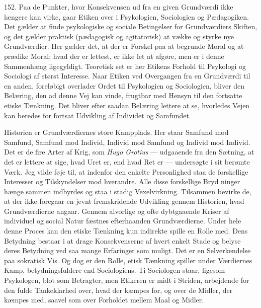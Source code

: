 \documentclass[12pt,a4paper]{book}
\newcommand{\opage}[1]{\marginnote{\footnotesize\textit{[#1]}}}
\begin{document}
152. Paa de Punkter, hvor Konsekvensen ud fra en given Grundværdi ikke længere kan virke,
gaar Etiken over i Psykologien, Sociologien og Pædagogiken. Det gælder at finde
psykologiske og sociale Betingelser for Grundværdiers Skiften, og det gælder praktisk
(pædagogisk og agitatorisk) at vække og styrke nye Grundværdier. Her gælder det, at der er
Forskel paa at begrunde Moral og at prædike Moral; hvad der er lettest, er ikke let at
afgøre, men er i denne Sammenhæng ligegyldigt. Teoretisk set er her Etikens Forhold til
Psykologi og Sociologi af størst Interesse. Naar Etiken ved Overgangen fra en Grundværdi
til en anden, foreløbigt overlader Ordet til Psykologien og Sociologien, bliver den Belæring, den ad denne Vej kan vinde, frugtbar med Hensyn til den fortsatte etiske Tænkning. Det
bliver efter saadan Belæring lettere at se, hvorledes Vejen kan beredes for fortsat
Udvikling af Individet og Samfundet.

Historien er Grundværdiernes store Kampplads. Her staar Samfund mod Samfund, Samfund mod
Individ, Individ mod Samfund og Individ mod Individ. Det er de fire Arter af Krig, som
\emph{Hugo Grotius} --- udgaaende fra den Sætning, at det er lettere at sige, hvad Uret er,
end hvad Ret er --- undersøgte i sit berømte Værk. Jeg vilde føje til, at indenfor den
enkelte Personlighed staa de forskellige Interesser og Tilskyndelser mod hverandre. Alle
disse forskellige Bryd%
\opage{364}ninger hænge sammen indbyrdes og staa i stadig Vexelvirkning.
Tilsammen bevirke de, at der ikke foregaar en jevnt fremskridende Udvikling gennem
Historien, hvad Grundværdierne angaar. Gennem alvorlige og ofte dybtgaaende Kriser af
individuel og social Natur fæstnes efterhaanden Grundværdierne. Under hele denne Proces kan
den etiske Tænkning kun indirekte spille en Rolle med. Dens Betydning bestaar i at drage
Konsekvenserne af hvert enkelt Stade og belyse deres Betydning ved saa mange Erfaringer som
muligt. Det er en Selverkendelse paa sokratisk Vis. Og dog er den Rolle, etisk Tænkning
spiller under Værdiernes Kamp, betydningsfuldere end Sociologiens. Ti Sociologen staar,
ligesom Psykologen, blot som Betragter, men Etikeren er midt i Striden, arbejdende for den
fulde Tankeklarhed over, hvad der kæmpes for, og over de Midler, der kæmpes med, saavel som
over Forholdet mellem Maal og Midler.
\end{document}
